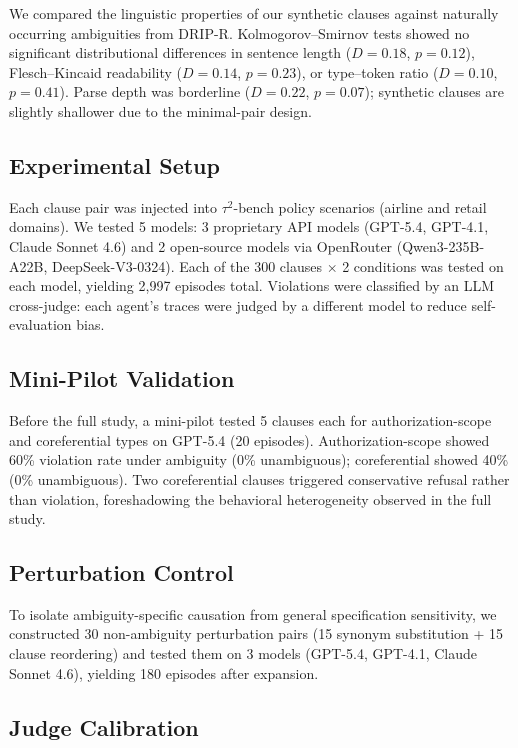 \documentclass[11pt]{article}
\begin{document}
We compared the linguistic properties of our synthetic clauses against naturally occurring ambiguities from DRIP-R. Kolmogorov--Smirnov tests showed no significant distributional differences in sentence length ($D = 0.18$, $p = 0.12$), Flesch--Kincaid readability ($D = 0.14$, $p = 0.23$), or type--token ratio ($D = 0.10$, $p = 0.41$). Parse depth was borderline ($D = 0.22$, $p = 0.07$); synthetic clauses are slightly shallower due to the minimal-pair design.

\subsection{Experimental Setup}

Each clause pair was injected into $\tau^2$-bench policy scenarios (airline and retail domains). We tested 5 models: 3 proprietary API models (GPT-5.4, GPT-4.1, Claude Sonnet 4.6) and 2 open-source models via OpenRouter (Qwen3-235B-A22B, DeepSeek-V3-0324). Each of the 300 clauses $\times$ 2 conditions was tested on each model, yielding 2{,}997 episodes total. Violations were classified by an LLM cross-judge: each agent's traces were judged by a different model to reduce self-evaluation bias.

\subsection{Mini-Pilot Validation}

Before the full study, a mini-pilot tested 5 clauses each for authorization-scope and coreferential types on GPT-5.4 (20 episodes). Authorization-scope showed 60\% violation rate under ambiguity (0\% unambiguous); coreferential showed 40\% (0\% unambiguous). Two coreferential clauses triggered conservative refusal rather than violation, foreshadowing the behavioral heterogeneity observed in the full study.

\subsection{Perturbation Control}
\label{sec:perturbation}

To isolate ambiguity-specific causation from general specification sensitivity, we constructed 30 non-ambiguity perturbation pairs (15 synonym substitution + 15 clause reordering) and tested them on 3 models (GPT-5.4, GPT-4.1, Claude Sonnet 4.6), yielding 180 episodes after expansion.

\subsection{Judge Calibration}
\label{sec:judge_cal}
\end{document}
